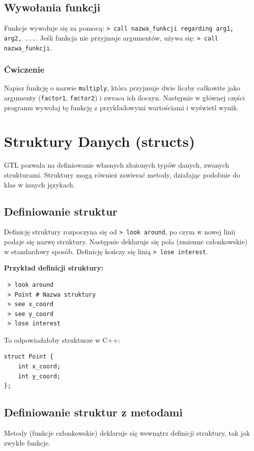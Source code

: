 \documentclass[12pt,a4paper]{article}
\begin{document}
\subsection{Wywołania funkcji}
Funkcje wywołuje się za pomocą: \texttt{> call {nazwa\_funkcji} regarding {arg1}, {arg2}, ...}. Jeśli funkcja nie przyjmuje argumentów, używa się: \texttt{> call {nazwa\_funkcji}}.

\subsubsection*{Ćwiczenie}
Napisz funkcję o nazwie \texttt{multiply}, która przyjmuje dwie liczby całkowite jako argumenty (\texttt{factor1}, \texttt{factor2}) i zwraca ich iloczyn. Następnie w głównej części programu wywołaj tę funkcję z przykładowymi wartościami i wyświetl wynik.

\newpage
\section{Struktury Danych (structs)}
\label{sec:structs}
GTL pozwala na definiowanie własnych złożonych typów danych, zwanych strukturami. Struktury mogą również zawierać metody, działając podobnie do klas w innych językach.

\subsection{Definiowanie struktur}
Definicję struktury rozpoczyna się od \texttt{> look around}, po czym w nowej linii podaje się nazwę struktury. Następnie deklaruje się pola (zmienne członkowskie) w standardowy sposób. Definicję kończy się linią \texttt{> lose interest}.

\textbf{Przykład definicji struktury:}
\begin{lstlisting}
 > look around
 > Point # Nazwa struktury
 > see x_coord
 > see y_coord
 > lose interest
\end{lstlisting}
To odpowiadałoby strukturze w C++:
\begin{verbatim}
struct Point {
    int x_coord;
    int y_coord;
};
\end{verbatim}

\subsection{Definiowanie struktur z metodami}
Metody (funkcje członkowskie) deklaruje się wewnątrz definicji struktury, tak jak zwykłe funkcje.
\end{document}
